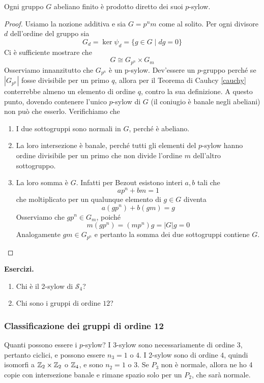 \begin{multicols}{2}
\begin{theorem}
	Ogni gruppo $ G $ abeliano finito è prodotto diretto dei suoi $ p $-sylow.
\end{theorem}
\begin{proof}
	Usiamo la nozione additiva e sia $ G = p^nm $ come al solito. Per ogni divisore $ d$ dell'ordine del gruppo sia
	\[ G_d = \ker\psi_d = \{ g \in G \mid dg = 0 \} \]
	Ci è sufficiente mostrare che
	\[ G \cong G_{p^n} \times G_m \]
	Osserviamo innanzitutto che $ G_{p^n} $ è un p-sylow. Dev'essere un $ p $-gruppo perché se $ |G_{p^n}| $ fosse divisibile per un primo $ q $, allora per il Teorema di Cauhcy \ref{cauchy} conterrebbe almeno un elemento di ordine $ q $, contro la sua definizione. A questo punto, dovendo contenere l'unico $ p $-sylow di $ G $  (il coniugio è banale negli abeliani) non può che esserlo.
	Verifichiamo che
	\begin{enumerate}
		\item I due sottogruppi sono normali in $ G $, perché è abeliano.
		\item La loro intersezione è banale, perché tutti gli elementi del $ p $-sylow hanno ordine divisibile per un primo che non divide l'ordine $ m $ dell'altro sottogruppo.
		\item La loro somma è $ G $. Infatti per Bezout esistono interi $ a, b $ tali che
		\[ ap^n + bm = 1 \]
		che moltiplicato per un qualunque elemento di $ g \in G $ diventa
		\[ a(gp^n) + b(gm) = g \]
		Osserviamo che $ gp^n \in G_{m} $, poiché $$  m (gp^n) = (mp^n) g = |G| g = 0  $$
		Analogamente $ gm \in G_{p^n} $ e pertanto la somma dei due sottogruppi contiene $ G $.
	\end{enumerate}
\end{proof}

\textbf{Esercizi.}
\begin{enumerate}
	\item Chi è il 2-sylow di $ \mathcal{S}_4 $?
	\item Chi sono i gruppi di ordine $ 12 $?
\end{enumerate}
\bigskip
\subsubsection{Classificazione dei gruppi di ordine 12}

Quanti possono essere i $ p $-sylow?
I 3-sylow sono necessariamente di ordine $ 3 $, pertanto ciclici, e possono essere $ n_3 = 1 $ o $ 4 $. I 2-sylow sono di ordine $ 4 $, quindi isomorfi a $ \mathbb{Z}_2 \times \mathbb{Z}_2 $ o $ \mathbb{Z}_4 $, e sono $ n_2 = 1 $ o $ 3 $. Se $ P_3 $ non è normale, allora ne ho 4 copie con intersezione banale e rimane spazio solo per un $ P_2 $, che sarà normale. \\


\end{multicols}
